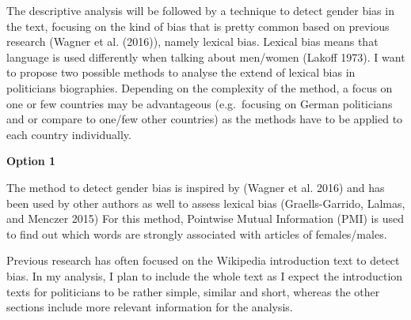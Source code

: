 \documentclass[
]{article}
\begin{document}
The descriptive analysis will be followed by a technique to detect
gender bias in the text, focusing on the kind of bias that is pretty
common based on previous research (Wagner et al. (2016)), namely lexical
bias. Lexical bias means that language is used differently when talking
about men/women (Lakoff 1973). I want to propose two possible methods to
analyse the extend of lexical bias in politicians biographies. Depending
on the complexity of the method, a focus on one or few countries may be
advantageous (e.g.~focusing on German politicians and or compare to
one/few other countries) as the methods have to be applied to each
country individually.

\textbf{Option 1}

The method to detect gender bias is inspired by (Wagner et al. 2016) and
has been used by other authors as well to assess lexical bias
(Graells-Garrido, Lalmas, and Menczer 2015) For this method, Pointwise
Mutual Information (PMI) is used to find out which words are strongly
associated with articles of females/males.

Previous research has often focused on the Wikipedia introduction text
to detect bias. In my analysis, I plan to include the whole text as I
expect the introduction texts for politicians to be rather simple,
similar and short, whereas the other sections include more relevant
information for the analysis.
\end{document}
